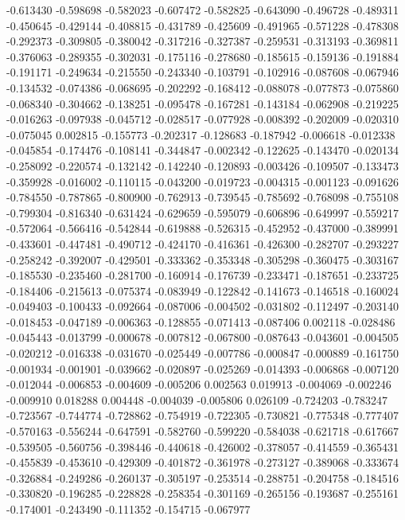 -0.613430
-0.598698
-0.582023
-0.607472
-0.582825
-0.643090
-0.496728
-0.489311
-0.450645
-0.429144
-0.408815
-0.431789
-0.425609
-0.491965
-0.571228
-0.478308
-0.292373
-0.309805
-0.380042
-0.317216
-0.327387
-0.259531
-0.313193
-0.369811
-0.376063
-0.289355
-0.302031
-0.175116
-0.278680
-0.185615
-0.159136
-0.191884
-0.191171
-0.249634
-0.215550
-0.243340
-0.103791
-0.102916
-0.087608
-0.067946
-0.134532
-0.074386
-0.068695
-0.202292
-0.168412
-0.088078
-0.077873
-0.075860
-0.068340
-0.304662
-0.138251
-0.095478
-0.167281
-0.143184
-0.062908
-0.219225
-0.016263
-0.097938
-0.045712
-0.028517
-0.077928
-0.008392
-0.202009
-0.020310
-0.075045
0.002815
-0.155773
-0.202317
-0.128683
-0.187942
-0.006618
-0.012338
-0.045854
-0.174476
-0.108141
-0.344847
-0.002342
-0.122625
-0.143470
-0.020134
-0.258092
-0.220574
-0.132142
-0.142240
-0.120893
-0.003426
-0.109507
-0.133473
-0.359928
-0.016002
-0.110115
-0.043200
-0.019723
-0.004315
-0.001123
-0.091626
-0.784550
-0.787865
-0.800900
-0.762913
-0.739545
-0.785692
-0.768098
-0.755108
-0.799304
-0.816340
-0.631424
-0.629659
-0.595079
-0.606896
-0.649997
-0.559217
-0.572064
-0.566416
-0.542844
-0.619888
-0.526315
-0.452952
-0.437000
-0.389991
-0.433601
-0.447481
-0.490712
-0.424170
-0.416361
-0.426300
-0.282707
-0.293227
-0.258242
-0.392007
-0.429501
-0.333362
-0.353348
-0.305298
-0.360475
-0.303167
-0.185530
-0.235460
-0.281700
-0.160914
-0.176739
-0.233471
-0.187651
-0.233725
-0.184406
-0.215613
-0.075374
-0.083949
-0.122842
-0.141673
-0.146518
-0.160024
-0.049403
-0.100433
-0.092664
-0.087006
-0.004502
-0.031802
-0.112497
-0.203140
-0.018453
-0.047189
-0.006363
-0.128855
-0.071413
-0.087406
0.002118
-0.028486
-0.045443
-0.013799
-0.000678
-0.007812
-0.067800
-0.087643
-0.043601
-0.004505
-0.020212
-0.016338
-0.031670
-0.025449
-0.007786
-0.000847
-0.000889
-0.161750
-0.001934
-0.001901
-0.039662
-0.020897
-0.025269
-0.014393
-0.006868
-0.007120
-0.012044
-0.006853
-0.004609
-0.005206
0.002563
0.019913
-0.004069
-0.002246
-0.009910
0.018288
0.004448
-0.004039
-0.005806
0.026109
-0.724203
-0.783247
-0.723567
-0.744774
-0.728862
-0.754919
-0.722305
-0.730821
-0.775348
-0.777407
-0.570163
-0.556244
-0.647591
-0.582760
-0.599220
-0.584038
-0.621718
-0.617667
-0.539505
-0.560756
-0.398446
-0.440618
-0.426002
-0.378057
-0.414559
-0.365431
-0.455839
-0.453610
-0.429309
-0.401872
-0.361978
-0.273127
-0.389068
-0.333674
-0.326884
-0.249286
-0.260137
-0.305197
-0.253514
-0.288751
-0.204758
-0.184516
-0.330820
-0.196285
-0.228828
-0.258354
-0.301169
-0.265156
-0.193687
-0.255161
-0.174001
-0.243490
-0.111352
-0.154715
-0.067977
